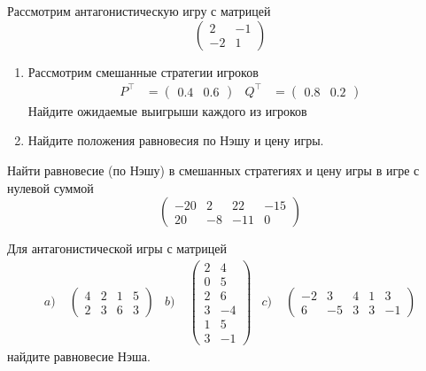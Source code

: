 \begin{exercise}
Рассмотрим антагонистическую игру с матрицей
\[
	\begin{pmatrix}
	2 & -1 \\ -2 & 1
	\end{pmatrix}
\]
\begin{enumerate}
	\item Рассмотрим  смешанные стратегии игроков 
	\begin{align*}
		P^\top&=\begin{pmatrix} 0.4 & 0.6 \end{pmatrix} &
		Q^\top&=\begin{pmatrix} 0.8 & 0.2 \end{pmatrix}
	\end{align*}
	Найдите ожидаемые выигрыши каждого из игроков
	\item Найдите положения равновесия по Нэшу и цену игры.
\end{enumerate}
\end{exercise}

\begin{exercise}
Найти равновесие (по Нэшу) в смешанных стратегиях и цену игры в
игре с нулевой суммой
\[
	\begin{pmatrix}
	-20 & 2 & 22 & -15 \\ 20 & -8 & -11 & 0
    \end{pmatrix}
\]
\end{exercise}

\begin{exercise}
Для антагонистической игры с матрицей
\begin{align*}
	a)&\;\begin{pmatrix} 4 & 2 & 1 & 5 \\ 2 & 3 & 6 & 3 \end{pmatrix} &
	b)&\; \begin{pmatrix} 2 & 4 \\ 0 & 5 \\ 2 & 6 \\ 3 & -4 \\ 1 & 5 \\ 3 & -1\end{pmatrix} &
	c)&\; \begin{pmatrix} -2 & 3 & 4 & 1 & 3 \\ 6 & -5 & 3 & 3 & -1 \end{pmatrix}
\end{align*}
найдите  равновесие Нэша.
\end{exercise}

